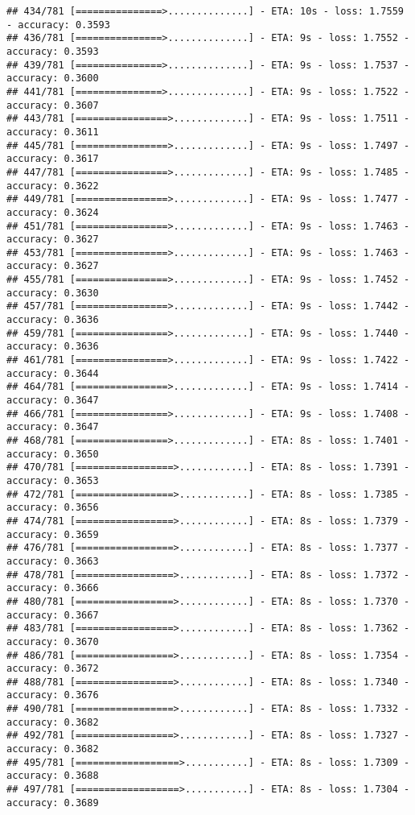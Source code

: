 \documentclass[
]{article}
\begin{document}
\begin{verbatim}
## 434/781 [===============>..............] - ETA: 10s - loss: 1.7559 - accuracy: 0.3593
## 436/781 [===============>..............] - ETA: 9s - loss: 1.7552 - accuracy: 0.3593 
## 439/781 [===============>..............] - ETA: 9s - loss: 1.7537 - accuracy: 0.3600
## 441/781 [===============>..............] - ETA: 9s - loss: 1.7522 - accuracy: 0.3607
## 443/781 [================>.............] - ETA: 9s - loss: 1.7511 - accuracy: 0.3611
## 445/781 [================>.............] - ETA: 9s - loss: 1.7497 - accuracy: 0.3617
## 447/781 [================>.............] - ETA: 9s - loss: 1.7485 - accuracy: 0.3622
## 449/781 [================>.............] - ETA: 9s - loss: 1.7477 - accuracy: 0.3624
## 451/781 [================>.............] - ETA: 9s - loss: 1.7463 - accuracy: 0.3627
## 453/781 [================>.............] - ETA: 9s - loss: 1.7463 - accuracy: 0.3627
## 455/781 [================>.............] - ETA: 9s - loss: 1.7452 - accuracy: 0.3630
## 457/781 [================>.............] - ETA: 9s - loss: 1.7442 - accuracy: 0.3636
## 459/781 [================>.............] - ETA: 9s - loss: 1.7440 - accuracy: 0.3636
## 461/781 [================>.............] - ETA: 9s - loss: 1.7422 - accuracy: 0.3644
## 464/781 [================>.............] - ETA: 9s - loss: 1.7414 - accuracy: 0.3647
## 466/781 [================>.............] - ETA: 9s - loss: 1.7408 - accuracy: 0.3647
## 468/781 [================>.............] - ETA: 8s - loss: 1.7401 - accuracy: 0.3650
## 470/781 [=================>............] - ETA: 8s - loss: 1.7391 - accuracy: 0.3653
## 472/781 [=================>............] - ETA: 8s - loss: 1.7385 - accuracy: 0.3656
## 474/781 [=================>............] - ETA: 8s - loss: 1.7379 - accuracy: 0.3659
## 476/781 [=================>............] - ETA: 8s - loss: 1.7377 - accuracy: 0.3663
## 478/781 [=================>............] - ETA: 8s - loss: 1.7372 - accuracy: 0.3666
## 480/781 [=================>............] - ETA: 8s - loss: 1.7370 - accuracy: 0.3667
## 483/781 [=================>............] - ETA: 8s - loss: 1.7362 - accuracy: 0.3670
## 486/781 [=================>............] - ETA: 8s - loss: 1.7354 - accuracy: 0.3672
## 488/781 [=================>............] - ETA: 8s - loss: 1.7340 - accuracy: 0.3676
## 490/781 [=================>............] - ETA: 8s - loss: 1.7332 - accuracy: 0.3682
## 492/781 [=================>............] - ETA: 8s - loss: 1.7327 - accuracy: 0.3682
## 495/781 [==================>...........] - ETA: 8s - loss: 1.7309 - accuracy: 0.3688
## 497/781 [==================>...........] - ETA: 8s - loss: 1.7304 - accuracy: 0.3689

\end{verbatim}
\end{document}
